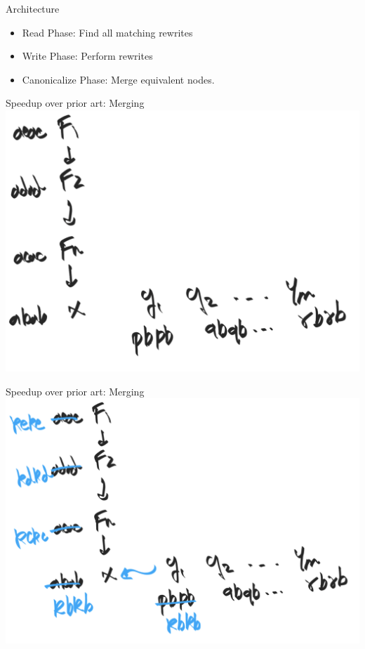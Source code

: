 \documentclass[8pt]{beamer}
\begin{document}
\begin{frame}{Architecture}
\begin{itemize}
\item Read Phase: Find all matching rewrites
\item Write Phase: Perform rewrites
\item Canonicalize Phase: Merge equivalent nodes.
\end{itemize}
\end{frame}

\begin{frame}[fragile]{Speedup over prior art: Merging}
\includegraphics[width=\textwidth]{./eg-2-1.png}
\end{frame}

\begin{frame}[fragile]{Speedup over prior art: Merging}
\includegraphics[width=\textwidth]{./eg-2-2.png}
\end{frame}
\end{document}
